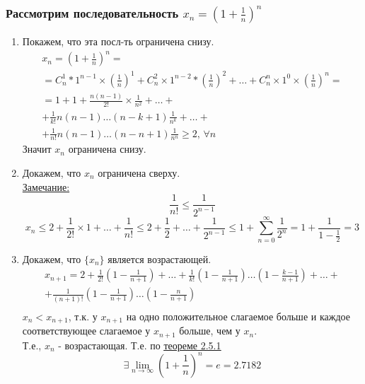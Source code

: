 \documentclass[12pt]{article}
\begin{document}
    \subsubsection*{Рассмотрим последовательность $x_n = \left(1+\frac{1}{n}\right)^n$}
    \begin{enumerate}
        \item Покажем, что эта посл-ть ограничена снизу.
        \begin{gather*}
            x_n = \left(1 + \frac{1}{n}\right)^n =\\
            = C^{1}_{n}*1^{n-1}\times\left(\frac{1}{n}\right)^{1} + C^{2}_{n}\times1^{n-2}*\left(\frac{1}{n}\right)^{2} + \dots + C^n_{n}\times1^{0}\times\left(\frac{1}{n}\right)^n =\\
            = 1 + 1 + \frac{n(n-1)}{2!} \times \frac{1}{n^{2}} + \dots +\\
            + \frac{1}{k!}n(n-1)\dots(n-k+1)\frac{1}{n^{k}}+\dots+\\
            +\frac{1}{n!}n(n-1)\dots(n-n+1)\frac{1}{n^n} \ge 2 \text{, } \forall n
        \end{gather*}
        Значит $x_n$ ограничена снизу.
        \item Докажем, что $x_n$ ограничена сверху.\\
        \underline{Замечание:} 
        \[ \frac{1}{n!} \le \frac{1}{2^{n-1}} \]
        \begin{equation*}
            x_n \le 2 + \frac{1}{2!} \times 1 + \dots + \frac{1}{n!} \le 2 + \frac{1}{2} + \dots + \frac{1}{2^{n-1}} \le 1 + \sum_{n=0}^{\infty} \frac{1}{2^n} = 1 + \frac{1}{1-\frac{1}{2}} = 3
        \end{equation*}
        \item Докажем, что $\{x_n\}$ является возрастающей.\\
        \begin{gather*}
            x_{n+1} = 2 + \frac{1}{2!} (1 - \frac{1}{n+1}) + \dots + \frac{1}{k!} (1 - \frac{1}{n+1}) \dots (1 - \frac{k-1}{n+1}) + \dots +\\
            + \frac{1}{(n+1)!} (1 - \frac{1}{n+1}) \dots (1 - \frac{n}{n+1})\\
        \end{gather*}
        $x_n < x_{n+1}$, т.к. у $x_{n+1}$ на одно положительное слагаемое больше и каждое соответствующее слагаемое у $x_{n+1}$ больше, чем у $x_n$.\\
        \indent Т.е., $x_n$ - возрастающая. Т.е. по \underline{\hyperref[th:2.5.1]{теореме 2.5.1}} 
        \[ \exists \lim_{n\to\infty}(1+\frac{1}{n})^n = e = 2.7182 \]
    \end{enumerate}
\end{document}

